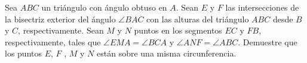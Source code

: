 Sea $ABC$ un triángulo con ángulo obtuso en $A$. Sean $E$ y $F$ las intersecciones de la
bisectriz exterior del ángulo $\angle BAC$ con las alturas del triángulo $ABC$ desde $B$ y $C$, respectivamente.
Sean $M$ y $N$ puntos en los segmentos $EC$ y $FB$, respectivamente, tales que $\angle EMA = \angle BCA$ y
$\angle ANF = \angle ABC$. Demuestre que los puntos $E$, $F$ , $M$ y $N$ están sobre una misma circunferencia.